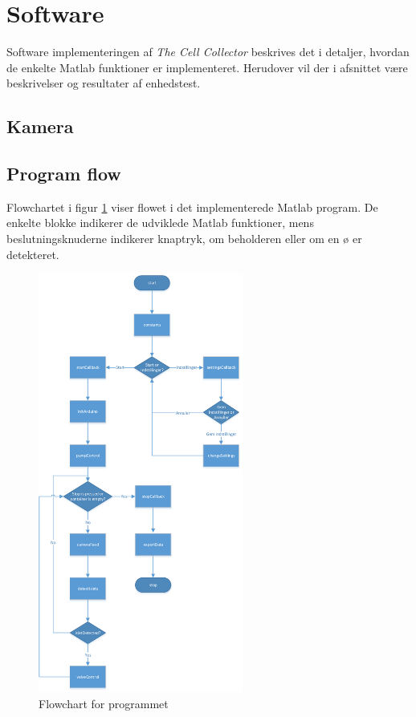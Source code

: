 \section{Software}
Software implementeringen af \textit{The Cell Collector} beskrives det i detaljer, hvordan de enkelte Matlab funktioner er implementeret. Herudover vil der i afsnittet være beskrivelser og resultater af enhedstest. 
 
\subsection{Kamera}



\newpage
\subsection{Program flow}
Flowchartet i figur \ref{fig:softwareFlowchart} viser flowet i det implementerede Matlab program. De enkelte blokke indikerer de udviklede Matlab funktioner, mens beslutningsknuderne indikerer knaptryk, om beholderen eller om en ø er detekteret. 
\begin{figure}[H]
	\centering
	\includegraphics[width=0.6\textwidth]{billeder/software/software_flowchart-crop.pdf}
	\caption{Flowchart for programmet}
	\label{fig:softwareFlowchart}
\end{figure}

